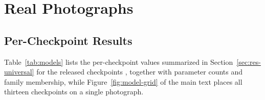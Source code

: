 \documentclass{article} %
\theoremstyle{defstyle}
\theoremstyle{plain}
\begin{document}
\section{Real Photographs}

\subsection{Per-Checkpoint Results}
\label{sec:supp-models}

Table~\ref{tab:models} lists the per-checkpoint values summarized in
Section~\ref{sec:res-universal} for the released checkpoints
\citep{depthanything2024,da3_2025,depthpro2025,moge2025,moge3_2026,metric3d2023,unidepth2024,unidepthv2_2025},
together with parameter counts and family membership, while Figure~\ref{fig:model-grid} of
the main text places all thirteen checkpoints on a single photograph.
\end{document}
